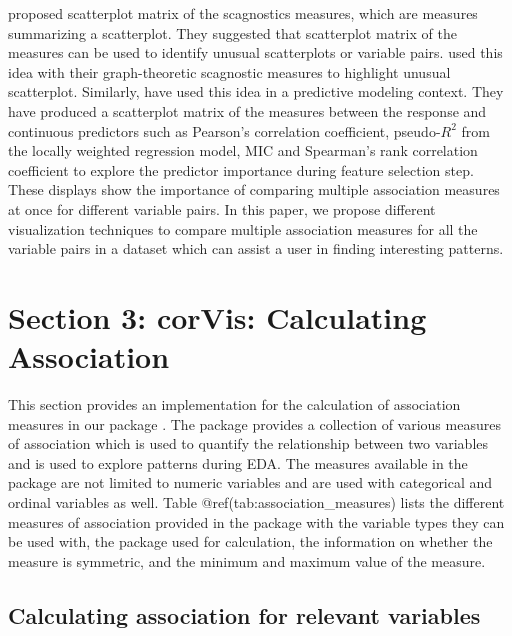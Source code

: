 \citet{tukey1985computer} proposed scatterplot matrix of the scagnostics
measures, which are measures summarizing a scatterplot. They suggested
that scatterplot matrix of the measures can be used to identify unusual
scatterplots or variable pairs. \citet{wilkinson2005graph} used this
idea with their graph-theoretic scagnostic measures to highlight unusual
scatterplot. Similarly, \citet{kuhn2013applied} have used this idea in a
predictive modeling context. They have produced a scatterplot matrix of
the measures between the response and continuous predictors such as
Pearson's correlation coefficient, pseudo-\(R^2\) from the locally
weighted regression model, MIC and Spearman's rank correlation
coefficient to explore the predictor importance during feature selection
step. These displays show the importance of comparing multiple
association measures at once for different variable pairs. In this
paper, we propose different visualization techniques to compare multiple
association measures for all the variable pairs in a dataset which can
assist a user in finding interesting patterns.

\hypertarget{section-3-corvis-calculating-association}{%
\section{Section 3: corVis: Calculating
Association}\label{section-3-corvis-calculating-association}}

This section provides an implementation for the calculation of
association measures in our package . The package
provides a collection of various measures of association which is used
to quantify the relationship between two variables and is used to
explore patterns during EDA. The measures available in the package are
not limited to numeric variables and are used with categorical and
ordinal variables as well. Table @ref(tab:association\_measures) lists
the different measures of association provided in the package with the
variable types they can be used with, the package used for calculation,
the information on whether the measure is symmetric, and the minimum and
maximum value of the measure.

\hypertarget{calculating-association-for-relevant-variables}{%
\subsection{Calculating association for relevant
variables}\label{calculating-association-for-relevant-variables}}


